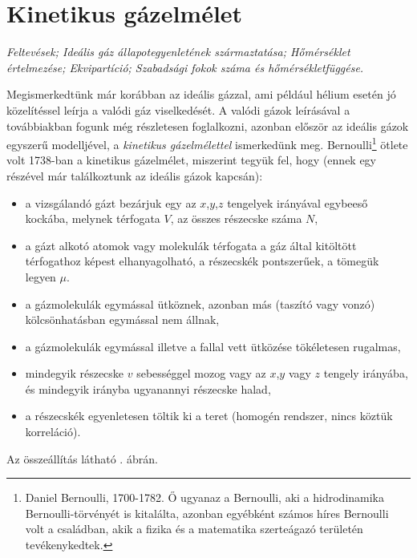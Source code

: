 \section{Kinetikus gázelmélet}

\emph{Feltevések; Ideális gáz állapotegyenletének származtatása; Hőmérséklet értelmezése; Ekvipartíció; Szabadsági fokok száma és hőmérsékletfüggése.}

Megismerkedtünk már korábban az ideális gázzal, ami például hélium esetén jó közelítéssel leírja a valódi gáz viselkedését. A valódi gázok leírásával a továbbiakban fogunk még részletesen foglalkozni, azonban először az ideális gázok egyszerű modelljével, a \emph{kinetikus gázelmélettel} ismerkedünk meg. Bernoulli\footnote{Daniel Bernoulli, 1700-1782. Ő ugyanaz a Bernoulli, aki a hidrodinamika Bernoulli-törvényét is kitalálta, azonban egyébként számos híres Bernoulli volt a családban, akik a fizika és a matematika szerteágazó területén tevékenykedtek.} ötlete volt 1738-ban a kinetikus gázelmélet, miszerint tegyük fel, hogy (ennek egy részével már találkoztunk az ideális gázok kapcsán):
\begin{itemize}
    \item a vizsgálandó gázt bezárjuk egy az $x$,$y$,$z$ tengelyek irányával egybeeső kockába, melynek térfogata $V$, az összes részecske száma $N$,
    \item a gázt alkotó atomok vagy molekulák térfogata a gáz által kitöltött térfogathoz képest elhanyagolható, a részecskék pontszerűek, a tömegük legyen $\mu$.
    \item a gázmolekulák egymással ütköznek, azonban más (taszító vagy vonzó) kölcsönhatásban egymással nem állnak,
    \item a gázmolekulák egymással illetve a fallal vett ütközése tökéletesen rugalmas,
    \item mindegyik részecske $v$ sebességgel mozog vagy az $x$,$y$ vagy $z$ tengely irányába, és mindegyik irányba ugyanannyi részecske halad,
    \item a részecskék egyenletesen töltik ki a teret (homogén rendszer, nincs köztük korreláció).
\end{itemize}
Az összeállítás látható . ábrán.
